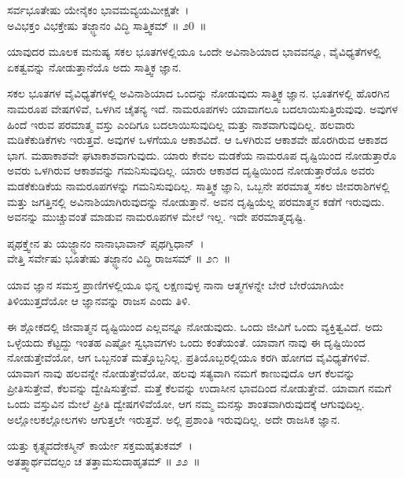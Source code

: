 \begin{shloka}
ಸರ್ವಭೂತೇಷು ಯೇನೈಕಂ ಭಾವಮವ್ಯಯಮೀಕ್ಷತೇ~।\\ಅವಿಭಕ್ತಂ ವಿಭಕ್ತೇಷು ತಜ್ಜ್ಞಾನಂ ವಿದ್ಧಿ ಸಾತ್ತ್ವಿಕಮ್ \hfill॥ ೨0~॥
\end{shloka}

\begin{artha}
ಯಾವುದರ ಮೂಲಕ ಮನುಷ್ಯ ಸಕಲ ಭೂತಗಳಲ್ಲಿಯೂ ಒಂದೇ ಅವಿನಾಶಿಯಾದ ಭಾವವನ್ನೂ, ವೈವಿಧ್ಯತೆಗಳಲ್ಲಿ ಏಕತ್ವವನ್ನು ನೋಡುತ್ತಾನೆಯೊ ಅದು ಸಾತ್ತ್ವಿಕ ಜ್ಞಾನ.
\end{artha}

ಸಕಲ ಭೂತಗಳ ವೈವಿಧ್ಯತೆಗಳಲ್ಲಿ ಅವಿನಾಶಿಯಾದ ಒಂದನ್ನು ನೋಡುವುದು ಸಾತ್ತ್ವಿಕ ಜ್ಞಾನ. ಭೂತಗಳಲ್ಲಿ ಹೊರಗಿನ ನಾಮರೂಪ ವೇಷಗಳಿವೆ, ಒಳಗಿನ ಚೈತನ್ಯ ಇದೆ. ನಾಮರೂಪಗಳು ಯಾವಾಗಲೂ ಬದಲಾಯಿಸುತ್ತಿರುವುವು. ಅವುಗಳ ಹಿಂದೆ ಇರುವ ಪರಮಾತ್ಮ ವಸ್ತು ಎಂದಿಗೂ ಬದಲಾಯಿಸುವುದಿಲ್ಲ ಮತ್ತು ನಾಶವಾಗುವುದಿಲ್ಲ. ಹಲವಾರು ಮಡಿಕೆಕುಡಿಕೆಗಳು ಇರುತ್ತವೆ. ಅವುಗಳ ಒಳಗೆಯೂ ಆಕಾಶವಿದೆ. ಆ ಒಳಗಿರುವ ಆಕಾಶವೇ ಹೊರಗಿರುವ ಆಕಾಶದ ಭಾಗ. ಮಹಾಕಾಶವೇ ಘಟಾಕಾಶವಾಗುವುದು. ಯಾರು ಕೇವಲ ಮಡಕೆಯ ನಾಮರೂಪ ದೃಷ್ಟಿಯಿಂದ ನೋಡುತ್ತಾರೊ ಅವರು ಒಳಗಿರುವ ಆಕಾಶವನ್ನು ಗಮನಿಸುವುದಿಲ್ಲ. ಯಾರು ಆಕಾಶದ ದೃಷ್ಟಿಯಿಂದ ನೋಡುತ್ತಾರೆಯೊ ಅವರು ಮಡಕೆಕುಡಿಕೆಯ ನಾಮರೂಪಗಳನ್ನು ಗಮನಿಸುವುದಿಲ್ಲ. ಸಾತ್ತ್ವಿಕ ಜ್ಞಾನಿ, ಒಬ್ಬನೇ ಪರಮಾತ್ಮ ಸಕಲ ಜೀವರಾಶಿಗಳಲ್ಲಿ ಮತ್ತು ಜಗತ್ತಿನಲ್ಲಿ ಅವಿನಾಶಿಯಾಗಿರುವುದನ್ನು ನೋಡುತ್ತಾನೆ. ಅವನ ದೃಷ್ಟಿಯೆಲ್ಲ ಪರಮಾತ್ಮನ ಕಡೆಗೆ ಇರುವುದು. ಅವನನ್ನು ಮುಚ್ಚುವಂತೆ ಮಾಡುವ ನಾಮರೂಪಗಳ ಮೇಲೆ ಇಲ್ಲ. ಇದೇ ಪರಮಾತ್ಮದೃಷ್ಟಿ.

\begin{shloka}
ಪೃಥಕ್ತ್ವೇನ ತು ಯಜ್ಜ್ಞಾನಂ ನಾನಾಭಾವಾನ್ ಪೃಥಗ್ವಿಧಾನ್~।\\ವೇತ್ತಿ ಸರ್ವೇಷು ಭೂತೇಷು ತಜ್ಜ್ಞಾನಂ ವಿದ್ಧಿ ರಾಜಸಮ್ \hfill॥ ೨೧~॥
\end{shloka}

\begin{artha}
ಯಾವ ಜ್ಞಾನ ಸಮಸ್ತ ಪ್ರಾಣಿಗಳಲ್ಲಿಯೂ ಭಿನ್ನ ಲಕ್ಷಣವುಳ್ಳ ನಾನಾ ಆತ್ಮಗಳನ್ನೇ ಬೇರೆ ಬೇರೆಯಾಗಿಯೇ ತಿಳಿಯುತ್ತದೆಯೋ ಆ ಜ್ಞಾನವನ್ನು ರಾಜಸ ಎಂದು ತಿಳಿ.
\end{artha}

\newpage

ಈ ಶ್ಲೋಕದಲ್ಲಿ ಜೀವಾತ್ಮನ ದೃಷ್ಟಿಯಿಂದ ಎಲ್ಲವನ್ನೂ ನೋಡುವುದು. ಒಂದು ಜೀವಿಗೆ ಒಂದು ವ್ಯಕ್ತಿತ್ವವಿದೆ. ಅದು ಒಳ್ಳೆಯದು ಕೆಟ್ಟದ್ದು ಇಂತಹ ಎಷ್ಟೋ ಸ್ವಭಾವಗಳು ಒಂದು ಕಂತೆಯಂತೆ. ಯಾವಾಗ ನಾವು ಈ ದೃಷ್ಟಿಯಿಂದ ನೋಡುತ್ತೇವೆಯೋ, ಆಗ ಒಬ್ಬನಂತೆ ಮತ್ತೊಬ್ಬನಿಲ್ಲ. ಪ್ರತಿಯೊಬ್ಬರಲ್ಲಿಯೂ ಕರಗಿ ಹೋಗದ ವೈವಿಧ್ಯತೆಗಳಿವೆ. ಯಾವಾಗ ನಾವು ಹಲವನ್ನೇ ನೋಡುತ್ತೇವೆಯೋ, ಹಲವು ಸತ್ಯವಾಗಿ ನಮಗೆ ಕಾಣುವುದೊ ಆಗ ಕೆಲವನ್ನು ಪ್ರೀತಿಸುತ್ತೇವೆ, ಕೆಲವನ್ನು ದ್ವೇಷಿಸುತ್ತೇವೆ. ಮತ್ತೆ ಕೆಲವನ್ನು ಉದಾಸೀನ ಭಾವದಿಂದ ನೋಡುತ್ತೇವೆ. ಯಾವಾಗ ನಮಗೆ ಒಂದು ವಸ್ತುವಿನ ಮೇಲೆ ಪ್ರೀತಿ ದ್ವೇಷಗಳಿವೆಯೋ, ಆಗ ನಮ್ಮ ಮನಸ್ಸು ಶಾಂತವಾಗಿರುವುದಕ್ಕೆ ಆಗುವುದಿಲ್ಲ. ಅಲ್ಲೋಲಕಲ್ಲೋಲಗಳು ಆಗುತ್ತಲೇ ಇರುತ್ತವೆ. ಅಲ್ಲಿ ಪ್ರಶಾಂತಿ ಇರುವುದಿಲ್ಲ. ಅದೇ ರಾಜಸಿಕ ಜ್ಞಾನ.

\begin{shloka}
ಯತ್ತು ಕೃತ್ಸ್ನವದೇಕಸ್ಮಿನ್ ಕಾರ್ಯೇ ಸಕ್ತಮಹೈತುಕಮ್~।\\ಅತತ್ತ್ವಾರ್ಥವದಲ್ಪಂ ಚ ತತ್ತಾಮಸುದಾಹೃತಮ್ \hfill॥ ೨೨~॥
\end{shloka}

